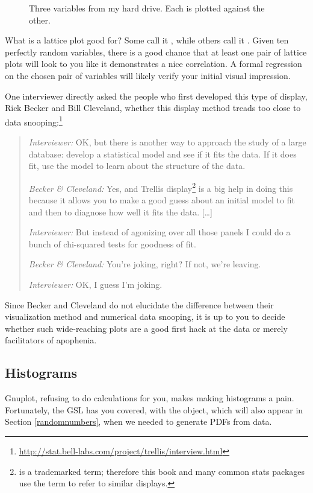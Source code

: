 \begin{figure}
\caption{Three variables from my hard drive. Each is plotted against the
other.}\label{trellis}
\end{figure}

What is a lattice plot good for? Some call it , while others call it . Given ten perfectly
random variables, there is a good chance that at least one pair of
lattice plots will look to you like it demonstrates a nice correlation.
A formal regression on the chosen pair of variables will likely
verify your initial visual impression. 

One interviewer directly asked the people who first developed
this type of display, Rick Becker and Bill Cleveland,
whether this display method treads too close to data
snooping:\footnote{\url{http://stat.bell-labs.com/project/trellis/interview.html}}

\begin{quote}
{\em Interviewer:} OK, but there is another way to approach the study of a large database:
develop a statistical model and see if it fits the data. If it does fit,
use the model to learn about the structure of the data.

{\em Becker \& Cleveland:} Yes, and Trellis
display\footnote{ is a trademarked term; therefore
this book and many common stats packages use the term 
to refer to similar displays.} is a big help in doing this because it
allows you to make a good guess about an initial model to fit and then
to diagnose how well it fits the data. [\dots]

{\em Interviewer:} But instead of agonizing over all those panels I could do a bunch of
chi-squared tests for goodness of fit.

{\em Becker \& Cleveland:} You're joking, right? If not, we're leaving.

{\em Interviewer:} OK, I guess I'm joking.
\end{quote}

Since Becker and Cleveland do not elucidate the difference between their
visualization method and numerical data snooping, it is up to you to
decide whether such wide-reaching plots are a good first hack at the
data or merely facilitators of apophenia.

\subsection{Histograms} \label{histosec}
Gnuplot, refusing to do calculations for you,
makes making histograms a pain.  Fortunately, the GSL has you covered,
with the  object, which will also appear
in Section \ref{randomnumbers}, when we needed to generate PDFs from data.

